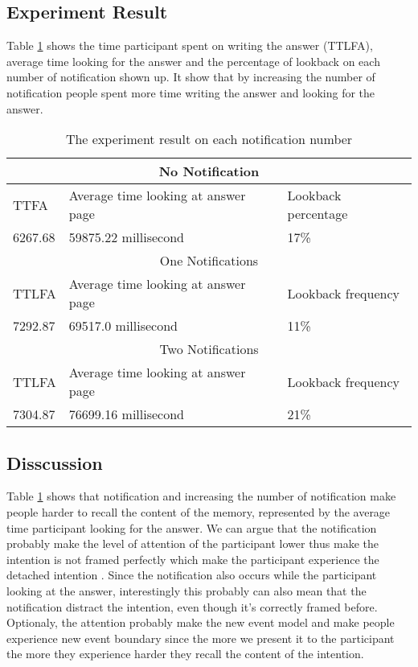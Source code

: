 \subsection{Experiment Result}
Table \ref{tab:notifiactionNumber} shows the time participant spent on writing the answer (TTLFA), average time looking for the answer
and the percentage of lookback on each number of notification shown up.
It show that by increasing the number of notification people spent more time writing the answer and looking for the answer.

\begin{table}[]
\centering
\begin{tabular}{|l|l|l|}
\hline
\multicolumn{3}{|c|}{No Notification}                      \\ \hline
TTFA    & Average time looking  at answer page & Lookback percentage \\ \hline
6267.68 & 59875.22 millisecond                   & 17\%                   \\ \hline
\multicolumn{3}{|c|}{One Notifications}                     \\ \hline
TTLFA   & Average time looking at answer page  & Lookback frequency \\ \hline
7292.87 & 69517.0 millisecond                    & 11\%                 \\ \hline
\multicolumn{3}{|c|}{Two Notifications}                      \\ \hline
TTLFA   & Average time looking at answer page  & Lookback frequency \\ \hline
7304.87 & 76699.16  millisecond                   & 21\%                 \\ \hline
\end{tabular}
\caption{The experiment result on each notification number}
\label{tab:notifiactionNumber}
\end{table}

\subsection{Disscussion}
Table \ref{tab:notifiactionNumber} shows that notification and increasing the number of notification make people harder to recall the content of the memory, represented by the average time participant looking for the answer.
We can argue that the notification probably make the level of attention of the participant lower thus make the intention is not framed perfectly
which make the participant experience the detached intention \citep{Reason1984}. Since the notification
also occurs while the participant looking at the answer, interestingly this probably can also mean that the notification distract the intention, even though it's correctly framed before.
Optionaly, the attention probably make the new event model and make people experience new event boundary since the more we present it to the
participant the more they experience harder they recall the content of the intention.

